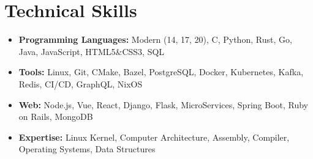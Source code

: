 \documentclass[letterpaper,11pt]{article}
\def\vspaceAfterBullets{3.5pt} %
\newcommand{\bulletItem}[1]{
  \item\small{
    {#1}
  }
}
\newcommand{\sectionListStart}{\begin{itemize}[leftmargin=0pt, label={}]}
\newcommand{\sectionListEnd}{\end{itemize}}
\begin{document}

\section{Technical Skills}
\sectionListStart
\bulletItem{\textbf{Programming Languages:}{ Modern \Cpp (14, 17, 20), C, Python, Rust, Go, Java, JavaScript, HTML5\&CSS3, SQL}}
\vspace{\vspaceAfterBullets}
\bulletItem{\textbf{Tools:}{ Linux, Git, CMake, Bazel, PostgreSQL, Docker, Kubernetes, Kafka, Redis, CI/CD, GraphQL, NixOS}}
\vspace{\vspaceAfterBullets}
\bulletItem{\textbf{Web:}{ Node.js, Vue, React, Django, Flask, MicroServices, Spring Boot, Ruby on Rails, MongoDB }}
\vspace{\vspaceAfterBullets}
\bulletItem{\textbf{Expertise:}{ Linux Kernel, Computer Architecture, Assembly, Compiler, Operating Systems, Data Structures }}
\vspace{\vspaceAfterBullets}
\sectionListEnd


\end{document}
